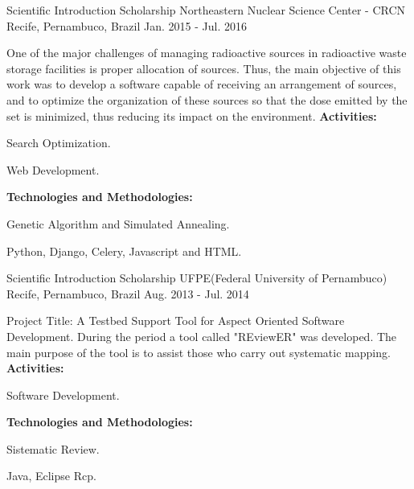 \begin{cventries}

\cventry
{Scientific Introduction Scholarship} %
{Northeastern Nuclear Science Center - CRCN} %
{Recife, Pernambuco, Brazil} %
{Jan. 2015 - Jul. 2016} %
{ %
One of the major challenges of managing radioactive sources in radioactive waste storage facilities is proper allocation of sources. Thus, the main objective of this work was to develop a software capable of receiving an arrangement of sources, and to optimize the organization of these sources so that the dose emitted by the set is minimized, thus reducing its impact on the environment. \vspace{1.5mm} \hfill \break
\textbf{Activities:} \hfill \break
\begin{cvitems}
\item {Search Optimization.}
\item {Web Development.}
\end{cvitems} \vspace{1.5mm} \hfill \break
\textbf{Technologies and Methodologies:} \hfill \break
\begin{cvitems}
\item {Genetic Algorithm and Simulated Annealing.}
\item {Python, Django, Celery, Javascript and HTML.}
\end{cvitems}
}


\cventry
{Scientific Introduction Scholarship} %
{UFPE(Federal University of Pernambuco)} %
{Recife, Pernambuco, Brazil} %
{Aug. 2013 - Jul. 2014} %
{ %
Project Title: A Testbed Support Tool for Aspect Oriented Software Development. During the period a tool called "REviewER" was developed. The main purpose of the tool is to assist those who carry out systematic mapping. \vspace{1.5mm} \hfill \break
\textbf{Activities:} \hfill \break
\begin{cvitems}
\item {Software Development.}
\end{cvitems} \vspace{1.5mm} \hfill \break
\textbf{Technologies and Methodologies:} \hfill \break
\begin{cvitems}
\item {Sistematic Review.}
\item {Java, Eclipse Rcp.}
\end{cvitems}
}


\end{cventries}